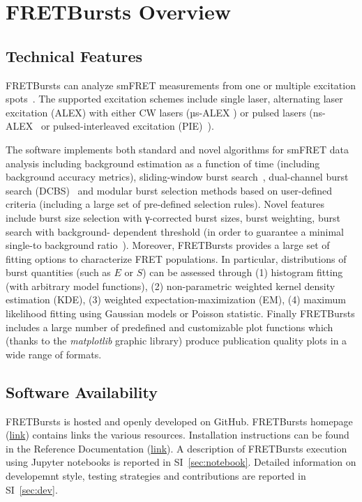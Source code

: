 \section{FRETBursts Overview}
\label{sec:overview}

\subsection{Technical Features}

FRETBursts can analyze smFRET measurements
from one or multiple excitation spots~\cite{Ingargiola_2013}. The supported
excitation schemes include single laser, alternating laser excitation (ALEX)
with either CW lasers (µs-ALEX \cite{Kapanidis_2005})
or pulsed lasers (ns-ALEX~\cite{Laurence_2005} or
pulsed-interleaved excitation (PIE)~\cite{M_ller_2005}).

The software implements both standard and novel algorithms for smFRET data analysis
including background estimation as a function of time (including background accuracy
metrics), sliding-window burst search~\cite{Eggeling_1998}, 
dual-channel burst search (DCBS)~\cite{Nir_2006} and
modular burst selection methods based on user-defined criteria
(including a large set of pre-defined selection rules). Novel features include burst size
selection with γ-corrected burst sizes, burst weighting, burst search with background-
dependent threshold (in order to guarantee a minimal single-to background 
ratio~\cite{Michalet_2012}).
Moreover, FRETBursts provides a large set of fitting options to characterize FRET populations. 
In particular, distributions of burst quantities (such as $E$ or $S$) can be assessed
through (1) histogram fitting (with arbitrary model functions),
(2) non-parametric weighted kernel density estimation (KDE), (3) weighted
expectation-maximization (EM), (4) maximum likelihood fitting using Gaussian models
or Poisson statistic. Finally FRETBursts includes a large number of
predefined and customizable plot functions which (thanks to the \textit{matplotlib}
graphic library) produce publication quality plots in a wide range of formats.

\subsection{Software Availability}
FRETBursts is hosted and openly developed on GitHub. FRETBursts homepage 
(\href{http://tritemio.github.io/FRETBursts}{link})
contains links the various resources. Installation instructions can be found in the
Reference Documentation (\href{http://fretbursts.readthedocs.org/en/latest/getting_started.html}{link}). 
A description of FRETBursts execution using Jupyter notebooks is reported 
in SI~\ref{sec:notebook}.
Detailed information on developemnt style, testing strategies and 
contributions are reported in SI~\ref{sec:dev}.